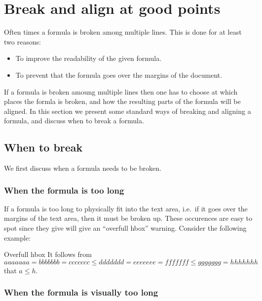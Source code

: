 \section{Break and align at good points}
\label{break and align ponts}

Often times a formula is broken among multiple lines.
This is done for at least two reasons:
\begin{itemize}
  \item
    To improve the readability of the given formula.
  \item
    To prevent that the formula goes over the margins of the document.
\end{itemize}
If a formula is broken amoung multiple lines then one has to choose at which places the formla is broken, and how the resulting parts of the formula will be aligned.
In this section we present some standard ways of breaking and aligning a formula, and discuss when to break a formula.



\subsection{When to break}

We first discuss when a formula needs to be broken.

\subsubsection{When the formula is too long}

If a formula is too long to physically fit into the text area, i.e.\ if it goes over the margins of the text area, then it must be broken up.
These occurences are easy to spot since they give will give an \enquote{overfull hbox} warning.
Consider the following example:
\begingroup
\begin{showlatex}[before lower = {\hfuzz = 40pt}, after lower = {\hfuzz = 0pt}]{Overfull hbox}
  It follows from
  \[
    aaaaaaa
    =
    bbbbbbb
    =
    ccccccc
    \leq
    ddddddd
    =
    eeeeeee
    =
    fffffff
    \leq
    ggggggg
    =
    hhhhhhh
  \]
  that $a \leq h$.
\end{showlatex}
\endgroup

\subsubsection{When the formula is visually too long}


